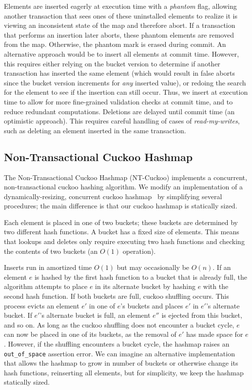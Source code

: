 Elements are inserted eagerly at execution time with a \emph{phantom} flag, allowing another transaction that sees ones of these uninstalled elements to realize it is viewing an inconsistent state of the map and therefore abort. If a transaction that performs an insertion later aborts, these phantom elements are removed from the map. Otherwise, the phantom mark is erased during commit. An alternative approach would be to insert all elements at commit time. However, this requires either relying on the bucket version to determine if another transaction has inserted the same element (which would result in false aborts since the bucket version increments for \emph{any} inserted value), or redoing the search for the element to see if the insertion can still occur. Thus, we insert at execution time to allow for more fine-grained validation checks at commit time, and to reduce redundant computations. Deletions are delayed until commit time (an optimistic approach). This requires careful handling of cases of \emph{read-my-writes}, such as deleting an element inserted in the same transaction.

\subsection{Non-Transactional Cuckoo Hashmap}
\label{section:ntchm_algo}
The Non-Transactional Cuckoo Hashmap (NT-Cuckoo) implements a concurrent, non-transactional cuckoo hashing algorithm. We modify an implementation of a dynamically-resizing, concurrent cuckoo hashmap~\cite{cuckoocode} by simplifying several procedures; the main difference is that our cuckoo hashmap is statically sized.

Each element is placed in one of two buckets; these buckets are determined by two different hash functions. A bucket has a fixed size of elements. This means that lookups and deletes only require executing two hash functions and checking the contents of two buckets (an $O(1)$ operation).

Inserts run in amortized time $O(1)$ but may occasionally be $O(n)$.
If an element $e$ is hashed by the first hash function to a bucket that is already full, the algorithm attempts to place $e$ in its alternate bucket by hashing $e$ with the second hash function. If both buckets are full, cuckoo shuffling occurs. This process evicts an element $e'$ in one of $e$'s buckets and places $e'$ in $e'$'s alternate bucket. If $e'$'s alternate bucket is full, an element $e''$ is ejected from this bucket, and so on. As long as the cuckoo shuffling does not encounter a bucket cycle, $e$ can now be placed in one of its buckets, as the removal of $e'$ has made space for $e$.
However, if the shuffling encounters a bucket cycle, the hashmap raises an \texttt{{out\_of\_space}} assertion error. We can imagine an alternative implementation that allows the hashmap to grow in number of buckets or otherwise change its hash functions, reinserting all elements, but for simplicity, we keep the hashmap statically sized.

